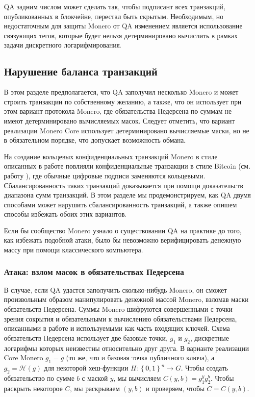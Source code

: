 \documentclass{mrl}
\begin{document}
QA задним числом может сделать так, чтобы подписант всех транзакций, опубликованных в блокчейне, перестал быть скрытым. Необходимым, но недостаточным для защиты Monero от QA изменением является использование связующих тегов, которые будет нельзя детерминировано вычислить в рамках задачи дискретного логарифмирования.


\subsection{Нарушение баланса транзакций}

В этом разделе предполагается, что QA заполучил несколько Monero и может строить транзакции по собственному желанию, а также, что он использует при этом вариант протокола Monero, где обязательства Педерсена по суммам не имеют детерминировано вычисляемых масок. Следует отметить, что вариант реализации Monero Core использует детерминировано вычисляемые маски, но не в обязательном порядке, что допускает возможность обмана.

На создание кольцевых конфиденциальных транзакций Monero в стиле описанных в работе \cite{noether2016ring} повлияли конфиденциальные транзакции в стиле Bitcoin (см. работу \cite{poelstra2018confidential}), где обычные цифровые подписи заменяются кольцевыми. Сбалансированность таких транзакций доказывается при помощи доказательств диапазона сумм транзакций. В этом разделе мы продемонстрируем, как QA двумя способами может нарушить сбалансированность транзакций, а также опишем способы избежать обоих этих вариантов.

Если бы сообщество Monero узнало о существовании QA на практике до того, как избежать подобной атаки, было бы невозможно верифицировать денежную массу при помощи классического компьютера.

\subsubsection{Атака: взлом масок в обязательствах Педерсена}\label{sec:breakbinding}

В случае, если QA удастся заполучить сколько-нибудь Monero, он сможет произвольным образом манипулировать денежной массой Monero, взломав маски обязательств Педерсена. Суммы Monero шифруются совершенными с точки зрения сокрытия и обязательными к вычислению обязательствами Педерсена, описанными в работе \cite{pedersen1991non} и используемыми как часть входящих ключей. Схема обязательств Педерсена использует две базовые точки, $g_1$ и $g_2$, дискретные логарифмы которых неизвестны относительно друг друга. В варианте реализации Core Monero $g_1 = g$ (то же, что и базовая точка публичного ключа), а $g_2 = \mathcal{H}(g)$ для некоторой хеш-функции $H:\left\{0,1\right\}^n \to G$. Чтобы создать обязательство по сумме $b$ с маской $y$, мы вычисляем $C(y,b) = g_1^y g_2^b$. Чтобы раскрыть некоторое $C$, мы раскрываем $(y, b)$ и проверяем, чтобы $C = C(y,b)$. 
\end{document}
